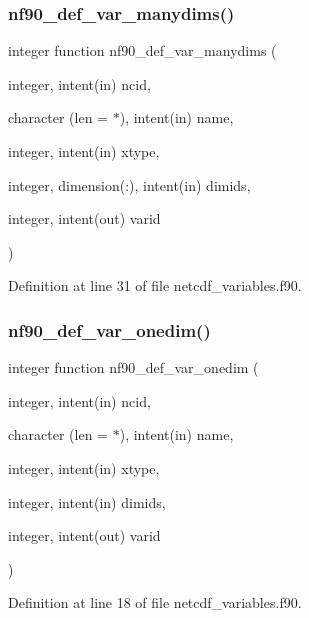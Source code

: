 \subsubsection{\texorpdfstring{nf90\+\_\+def\+\_\+var\+\_\+manydims()}{nf90\_def\_var\_manydims()}}
{\footnotesize\ttfamily integer function nf90\+\_\+def\+\_\+var\+\_\+manydims (\begin{DoxyParamCaption}\item[{integer, intent(in)}]{ncid,  }\item[{character (len = $\ast$), intent(in)}]{name,  }\item[{integer, intent(in)}]{xtype,  }\item[{integer, dimension(\+:), intent(in)}]{dimids,  }\item[{integer, intent(out)}]{varid }\end{DoxyParamCaption})}



Definition at line 31 of file netcdf\+\_\+variables.\+f90.

\mbox{\label{netcdf__variables_8f90_aa816d0c42f5189bd5b40c7131268666e}} 
\subsubsection{\texorpdfstring{nf90\+\_\+def\+\_\+var\+\_\+onedim()}{nf90\_def\_var\_onedim()}}
{\footnotesize\ttfamily integer function nf90\+\_\+def\+\_\+var\+\_\+onedim (\begin{DoxyParamCaption}\item[{integer, intent(in)}]{ncid,  }\item[{character (len = $\ast$), intent(in)}]{name,  }\item[{integer, intent(in)}]{xtype,  }\item[{integer, intent(in)}]{dimids,  }\item[{integer, intent(out)}]{varid }\end{DoxyParamCaption})}



Definition at line 18 of file netcdf\+\_\+variables.\+f90.

\mbox{\label{netcdf__variables_8f90_ab4e65fef4873720b23fc10d39d167def}} 
